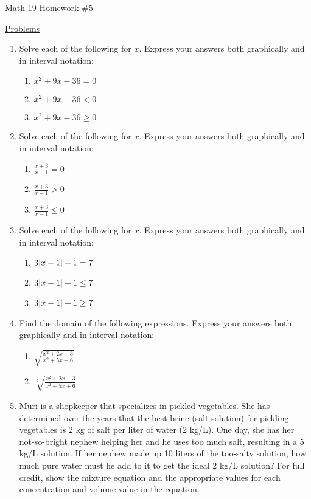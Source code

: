 \documentclass[letterpaper,12pt,fleqn]{article}
\begin{document}
\begin{center}
\Large Math-19 Homework \#5
\end{center}

\vspace{0.5in}

\underline{Problems}

\begin{enumerate}

\item Solve each of the following for $x$. Express your answers both
  graphically and in interval notation:
  \begin{enumerate}
  \item $x^2+9x-36=0$
  \item $x^2+9x-36<0$
  \item $x^2+9x-36\ge0$
  \end{enumerate}
  
\item Solve each of the following for $x$. Express your answers both
  graphically and in interval notation:
  \begin{enumerate}
  \item $\frac{x+3}{x-1}=0$
  \item $\frac{x+3}{x-1}>0$
  \item $\frac{x+3}{x-1}\le0$
  \end{enumerate}
  
\item Solve each of the following for $x$. Express your answers both
  graphically and in interval notation:
  \begin{enumerate}
  \item $3\lvert x-1\rvert+1=7$
  \item $3\lvert x-1\rvert+1\le7$
  \item $3\lvert x-1\rvert+1\ge7$
  \end{enumerate}

\item Find the domain of the following expressions. Express your answers both
  graphically and in interval notation:
  \begin{enumerate}
    \item $\sqrt{\frac{x^2+2x-3}{x^2+5x+6}}$
    \item $\sqrt[3]{\frac{x^2+2x-3}{x^2+5x+6}}$
  \end{enumerate}

\item Muri is a shopkeeper that specializes in pickled vegetables. She has
  determined over the years that the best brine (salt solution) for pickling
  vegetables is 2 kg of salt per liter of water (2 kg/L).  One day, she has her
  not-so-bright nephew helping her and he uses too much salt, resulting in
  a 5 kg/L solution.  If her nephew made up 10 liters of the too-salty solution,
  how much pure water must he add to it to get the ideal 2 kg/L solution? For
  full credit, show the mixture equation and the appropriate values for each
  concentration and volume value in the equation.
\end{enumerate}
\end{document}
